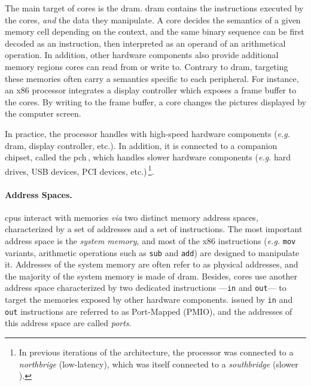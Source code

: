 The main target of cores \IOs is the \ac{dram}.
%
\ac{dram} contains the instructions executed by the cores, \emph{and} the data
they manipulate.
%
A core decides the semantics of a given memory cell depending on the context,
and the same binary sequence can be first decoded as an instruction, then
interpreted as an operand of an arithmetical operation.
%
In addition, other hardware components also provide additional memory regions
cores can read from or write to.
%
Contrary to \ac{dram}, \IOs targeting these memories often carry a semantics
specific to each peripheral.
%
For instance, an x86 processor integrates a display controller which exposes a
frame buffer to the cores.
%
By writing to the frame buffer, a core changes the pictures displayed by the
computer screen.

In practice, the processor handles \IOs with high-speed hardware components
(\emph{e.g.} \ac{dram}, display controller, etc.).
%
In addition, it is connected to a companion chipset, called the
\ac{pch}\,\cite{turley2014introx86}, which handles slower hardware components
(\emph{e.g.}  hard drives, USB devices, PCI devices, etc.)\,\footnote{In
  previous iterations of the architecture, the processor was connected to a
  \emph{northbrige} (low-latency), which was itself connected to a
  \emph{southbridge} (slower \IOs).}.

\paragraph{Address Spaces.}
%
\acp{cpu} interact with memories \emph{via} two distinct memory address spaces,
characterized by a set of addresses and a set of instructions.
%
The most important address space is the \emph{system memory}, and most of the
x86 instructions (\emph{e.g.} \texttt{mov} variants, arithmetic operations such
as \texttt{sub} and \texttt{add}) are designed to manipulate it.
%
Addresses of the system memory are often refer to as physical addresses, and the
majority of the system memory is made of \ac{dram}.
%
Besides, cores use another address space characterized by two dedicated
instructions ---\texttt{in} and \texttt{out}--- to target the memories exposed
by other hardware components.
%
\IOs issued by \texttt{in} and \texttt{out} instructions are referred to as
Port-Mapped \IOs (PMIO), and the addresses of this address space are called
\emph{ports}.

